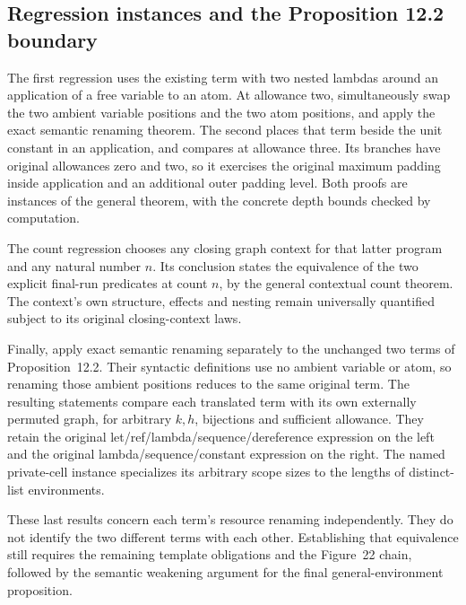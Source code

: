 \subsection{Regression instances and the Proposition 12.2 boundary}
The first regression uses the existing term with two nested lambdas around
an application of a free variable to an atom. At allowance two, simultaneously
swap the two ambient variable positions and the two atom positions, and apply
the exact semantic renaming theorem. The second places that term beside the
unit constant in an application, and compares at allowance three. Its branches
have original allowances zero and two, so it exercises the original maximum
padding inside application and an additional outer padding level. Both
proofs are instances of the general theorem, with the concrete depth bounds
checked by computation.


The count regression chooses any closing graph context for that latter
program and any natural number $n$. Its conclusion states the equivalence
of the two explicit final-run predicates at count $n$, by the general
contextual count theorem. The context's own structure, effects and nesting
remain universally quantified subject to its original closing-context laws.


Finally, apply exact semantic renaming separately to the unchanged two terms
of Proposition~12.2. Their syntactic definitions use no ambient variable or
atom, so renaming those ambient positions reduces to the same original term.
The resulting statements compare each translated term with its own externally
permuted graph, for arbitrary $k,h$, bijections and sufficient allowance.
They retain the original let/ref/lambda/sequence/dereference expression on
the left and the original lambda/sequence/constant expression on the right.
The named private-cell instance specializes its arbitrary scope sizes to the
lengths of distinct-list environments.


These last results concern each term's resource renaming independently.
They do not identify the two different terms with each other. Establishing
that equivalence still requires the remaining template obligations and the
Figure~22 chain, followed by the semantic weakening argument for the final
general-environment proposition.
